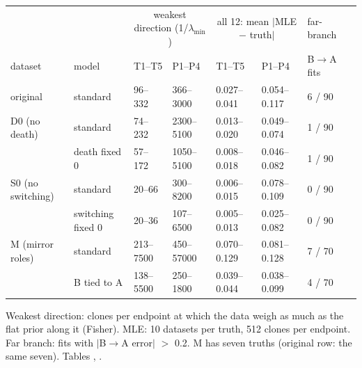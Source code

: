 \documentclass[10pt,a4paper]{article}
\newcommand{\BA}{B$\to$A}
\begin{document}
\begin{center}\footnotesize\setlength{\tabcolsep}{3pt}
\begin{tabular}{@{}llllllll@{}}\toprule
 & & \multicolumn{2}{c}{weakest direction (1/$\lambda_{\min}$)} & \multicolumn{2}{c}{all 12: mean $|$MLE $-$ truth$|$} & far-branch \\
dataset & model & T1--T5 & P1--P4 & T1--T5 & P1--P4 & \BA{} fits \\\midrule
original & standard & 96--332 & 366--3000 & 0.027--0.041 & 0.054--0.117 & 6 / 90 \\
D0 (no death) & standard & 74--232 & 2300--5100 & 0.013--0.020 & 0.049--0.074 & 1 / 90 \\
 & death fixed 0 & 57--172 & 1050--5100 & 0.008--0.018 & 0.046--0.082 & 1 / 90 \\
S0 (no switching) & standard & 20--66 & 300--8200 & 0.006--0.015 & 0.078--0.109 & 0 / 90 \\
 & switching fixed 0 & 20--36 & 107--6500 & 0.005--0.013 & 0.025--0.082 & 0 / 90 \\
M (mirror roles) & standard & 213--7500 & 450--57000 & 0.070--0.129 & 0.081--0.128 & 7 / 70 \\
 & B tied to A & 138--5500 & 250--1800 & 0.039--0.044 & 0.038--0.099 & 4 / 70 \\\bottomrule
\end{tabular}

Weakest direction: clones per endpoint at which the data weigh as much as the flat prior along it (Fisher). MLE: 10 datasets per truth, 512 clones per endpoint. Far branch: fits with $|$\BA{} error$|$ $>$ 0.2. M has seven truths (original row: the same seven). Tables , .
\end{center}
\end{document}
